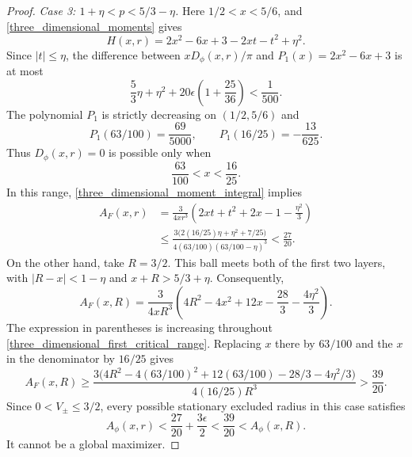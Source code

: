 \documentclass[12pt]{amsart}
\numberwithin{equation}{section}
\begin{document}
\begin{proof}
\medskip
\noindent\textit{Case 3: $1+\eta<p<5/3-\eta$.}
Here $1/2<x<5/6$, and \eqref{three_dimensional_moments} gives
\[
H(x,r)=2x^2-6x+3-2xt-t^2+\eta^2.
\]
Since $|t|\leq\eta$, the difference between
$xD_\phi(x,r)/\pi$ and $P_1(x)=2x^2-6x+3$ is at most
\[
\frac53\eta+\eta^2
       +20\epsilon\left(1+\frac{25}{36}\right)<\frac1{500}.
\]
The polynomial $P_1$ is strictly decreasing on $(1/2,5/6)$ and
\[
P_1(63/100)=\frac{69}{5000},\qquad
P_1(16/25)=-\frac{13}{625}.
\]
Thus $D_\phi(x,r)=0$ is possible only when
\begin{equation}
\label{three_dimensional_first_critical_range}
\frac{63}{100}<x<\frac{16}{25}.
\end{equation}
In this range, \eqref{three_dimensional_moment_integral} implies
\begin{align*}
A_F(x,r)
 &=\frac{3}{4xr^3}
       \left(2xt+t^2+2x-1-\frac{\eta^2}{3}\right)\\
 &\leq\frac{3\bigl(2(16/25)\eta+\eta^2+7/25\bigr)}
             {4(63/100)(63/100-\eta)^3}
 <\frac{27}{20}.
\end{align*}
On the other hand, take $R=3/2$. This ball meets both of the first
two layers, with $|R-x|<1-\eta$ and $x+R>5/3+\eta$.
Consequently,
\[
A_F(x,R)=\frac{3}{4xR^3}
       \left(4R^2-4x^2+12x-\frac{28}{3}-\frac{4\eta^2}{3}\right).
\]
The expression in parentheses is increasing throughout
\eqref{three_dimensional_first_critical_range}. Replacing $x$ there
by $63/100$ and the $x$ in the denominator by $16/25$ gives
\[
A_F(x,R)\geq
\frac{3\bigl(4R^2-4(63/100)^2+12(63/100)-28/3-4\eta^2/3\bigr)}
     {4(16/25)R^3}
>\frac{39}{20}.
\]
Since $0<V_\pm\leq3/2$, every possible stationary excluded radius
in this case satisfies
\[
A_\phi(x,r)<\frac{27}{20}+\frac{3\epsilon}{2}
       <\frac{39}{20}<A_\phi(x,R).
\]
It cannot be a global maximizer.


\end{proof}
\end{document}
